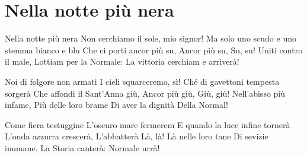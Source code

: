 \section{Nella notte più nera}
\subtitle{Sulla melodia di “Let's Go“ del Coro dell’Armata Rossa}
\begin{canzone}
Nella notte più nera
Non cerchiamo il sole, mio signor!
Ma solo uno scudo e uno stemma bianco e blu
Che ci porti ancor più su, 
Ancor più su,
Su, su!
Uniti contro il male,
Lottiam per la Normale:
La vittoria cerchiam e arriverà!

Noi di folgore non armati
I cieli squarceremo, sì!
Ché di gavettoni tempesta sorgerà
Che affondi il Sant’Anna giù, 
Ancor più giù, 
Giù, giù!
Nell’abisso più infame,
Più delle loro brame
Di aver la dignità
Della Normal!

Come fiera testuggine
L’oscuro mare fermerem
E quando la luce infine tornerà
L’onda azzurra crescerà,
L’abbatterà 
Là, là!
Là nelle loro tane
Di sevizie inumane.
La Storia canterà:
Normale urrà!
\end{canzone}

